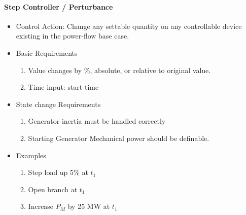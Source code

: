 \documentclass[12pt]{article}
\newcommand{\q}{(\textit{\textbf{?}})}
\begin{document}
\begin{multicols*}{2}
\raggedright
\noindent
\paragraph{Step Controller / Perturbance}
\begin{itemize}
	\item Control Action: Change any settable quantity on any controllable device existing in the power-flow base case.
	\item Basic Requirements
	\begin{enumerate}
		\item Value changes by \%, absolute, or relative to original value.
		\item Time input: start time
	\end{enumerate}
	\item State change Requirements
	\begin{enumerate}
		\item Generator inertia must be handled correctly
		\item Starting Generator Mechanical power should be definable.
	\end{enumerate}
	\item Examples
	\begin{enumerate}
		\item Step load up 5\% at $t_1$
		\item Open branch at $t_1$
		\item Increase $P_{M}$ by 25 MW at $t_1$
	\end{enumerate}
\end{itemize}


\end{multicols*}
\end{document}
